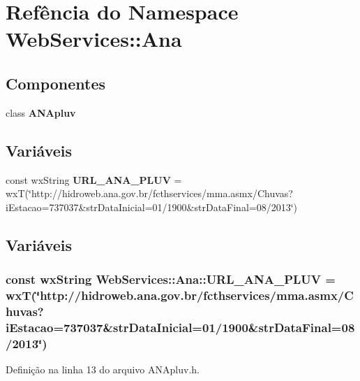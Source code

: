 \section{Refência do Namespace Web\+Services\+:\+:Ana}
\label{namespace_web_services_1_1_ana}
\subsection*{Componentes}
\begin{DoxyCompactItemize}
\item 
class {\bf A\+N\+Apluv}
\end{DoxyCompactItemize}
\subsection*{Variáveis}
\begin{DoxyCompactItemize}
\item 
const wx\+String {\bf U\+R\+L\+\_\+\+A\+N\+A\+\_\+\+P\+L\+UV} = wxT(\char`\"{}http\+://hidroweb.\+ana.\+gov.\+br/fcthservices/mma.\+asmx/Chuvas?i\+Estacao=737037\&str\+Data\+Inicial=01/1900\&str\+Data\+Final=08/2013\char`\"{})
\end{DoxyCompactItemize}


\subsection{Variáveis}
\subsubsection[{U\+R\+L\+\_\+\+A\+N\+A\+\_\+\+P\+L\+UV}]{\setlength{\rightskip}{0pt plus 5cm}const wx\+String Web\+Services\+::\+Ana\+::\+U\+R\+L\+\_\+\+A\+N\+A\+\_\+\+P\+L\+UV = wxT(\char`\"{}http\+://hidroweb.\+ana.\+gov.\+br/fcthservices/mma.\+asmx/Chuvas?i\+Estacao=737037\&str\+Data\+Inicial=01/1900\&str\+Data\+Final=08/2013\char`\"{})}\label{namespace_web_services_1_1_ana_ae5d6bd974bf9de62d07dc5e79edf689d}


Definição na linha 13 do arquivo A\+N\+Apluv.\+h.

